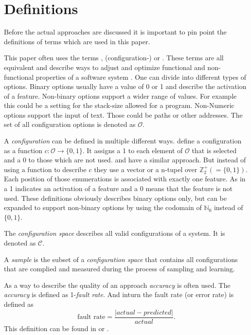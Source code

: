 \section{Definitions}

Before the actual approaches are discussed it is important to pin point the definitions of terms which are used in this paper.

This paper often uses the terms , (configuration-) or . These terms are all equivalent and describe ways to adjust and optimize functional and non-functional properties of a software system \cite{DistanceBasedSampling2019}.
One can divide into different types of options. Binary options usually have a value of 0 or 1 and describe the activation of a feature. Non-binary options support a wider range of values. For example this could be a setting for the stack-size allowed for a program. Non-Numeric options support the input of text. Those could be paths or other addresses.
The set of all configuration options is denoted as $\mathcal{O}$.

A \textit{configuration} can be defined in multiple different ways. \citet{DistanceBasedSampling2019} define a configuration as a function $c : \mathcal{O} \rightarrow \{0,1\}$. It assigns a 1 to each element of $\mathcal{O}$ that is selected and a 0 to those which are not used.
\citet{FasterDiscoveryofFasterSystemConfigurationsSiegmund2017} and \cite{VariabilityAwarePerformancePredictionJianmeiSigmundApel} have a similar approach. But instead of using a function to describe $c$ they use a vector or a n-tupel over $\mathbb{Z}^+_2(= \{0,1\})$. Each position of those enumerations is associated with exactly one feature. As in \cite{DistanceBasedSampling2019} a 1 indicates an activation of a feature and a 0 means that the feature is not used. These definitions obviously describes binary options only, but can be expanded to support non-binary options by using the codomain of $\mathbb{N}_0$ instead of $\{0,1\}$.

The \textit{configuration space} describes all valid configurations of a system. It is denoted as $\mathcal{C}$.

A \textit{sample} is the subset of a \textit{configuration space} that contains all configurations that are complied and measured during the process of sampling and learning.

As a way to describe the quality of an approach \textit{accuracy} is often used. The \textit{accuracy} is defined as 1-\textit{fault rate}. And inturn the fault rate (or error rate) is defined as 
\begin{equation}
	\text{fault rate}= \frac{|actual-predicted|}{actual}.
\end{equation} This definition can be found in \cite{AutomatedFeatureDetectionSiegmund2012} or \cite{FasterDiscoveryofFasterSystemConfigurationsSiegmund2017}.